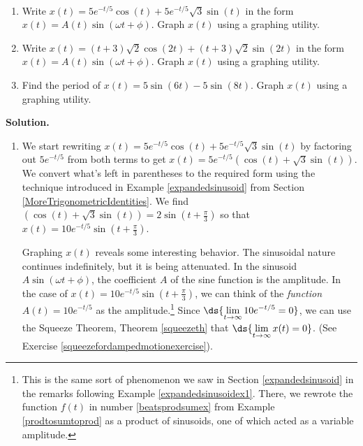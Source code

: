 \documentclass{ximera}
\begin{document}
\begin{example} \label{underdampedresonance}  $~$  

\begin{enumerate}

\item  \label{underdampedproblem} Write $x(t) = 5e^{-t/5} \cos(t) + 5e^{-t/5} \sqrt{3} \sin(t)$ in the form $x(t) = A(t) \sin(\omega t + \phi)$.  Graph $x(t)$ using a graphing utility.

\item  Write $x(t) = (t+3)\sqrt{2} \cos(2t) + (t+3) \sqrt{2} \sin(2t)$ in the form $x(t) = A(t) \sin(\omega t + \phi)$.  Graph $x(t)$  using a graphing utility.

\item  Find the period of $x(t) = 5\sin(6t) - 5\sin\left(8t\right)$.  Graph $x(t)$ using a graphing utility.

\end{enumerate}

{\bf Solution.}

\begin{enumerate}

\item  We start rewriting  $x(t) = 5e^{-t/5} \cos(t) + 5e^{-t/5} \sqrt{3} \sin(t)$ by factoring out   $5e^{-t/5}$ from both terms to get  $x(t) = 5e^{-t/5} \left( \cos(t) + \sqrt{3} \sin(t)\right)$. We convert what's left in parentheses to the required form using the technique introduced in Example  \ref{expandedsinusoid} from Section \ref{MoreTrigonometricIdentities}.  We find $\left( \cos(t) + \sqrt{3} \sin(t)\right) = 2\sin\left(t+\frac{\pi}{3}\right)$ so that $x(t) = 10e^{-t/5} \sin\left(t + \frac{\pi}{3}\right)$.    


 

Graphing $x(t)$ reveals some interesting behavior.  The sinusoidal nature continues indefinitely, but it is being attenuated.  In the sinusoid $A \sin(\omega t + \phi)$, the coefficient $A$ of the sine function is the amplitude.  In the case of $x(t) = 10e^{-t/5} \sin\left(t + \frac{\pi}{3}\right)$, we can think of the \textit{function} $A(t) = 10e^{-t/5}$ as the amplitude.\footnote{This is the same sort of phenomenon we saw in Section \ref{expandedsinusoid} in the remarks following Example \ref{expandedsinusoidex1}.  There,  we rewrote the function $f(t)$ in number  \ref{beatsprodsumex} from Example \ref{prodtosumtoprod} as a product of sinusoids, one of which acted as a variable amplitude.}  Since $\ds{\lim_{t \rightarrow \infty} 10e^{-t/5} = 0}$, we can use the Squeeze Theorem, Theorem \ref{squeezeth} that $\ds{\lim_{t \rightarrow \infty} x(t) = 0}$.  (See Exercise \ref{squeezefordampedmotionexercise}).


\end{enumerate}
\end{example}
\end{document}
